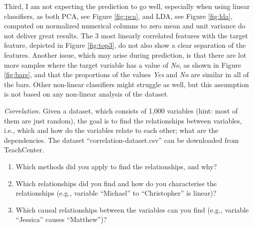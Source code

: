 \documentclass[a4paper,10pt]{article}\setlength{\textheight}{10in}\setlength{\textwidth}{6.5in}\setlength{\topmargin}{-0.125in}\setlength{\oddsidemargin}{-.2in}\setlength{\evensidemargin}{-.2in}\setlength{\headsep}{0.2in}\setlength{\footskip}{0pt}\usepackage{amsmath}\usepackage{fancyhdr}\usepackage{enumitem}\usepackage{hyperref}\usepackage{xcolor}\usepackage{graphicx}\pagestyle{fancy}
\begin{document}
\begin{enumerate}[topsep=0mm, partopsep=0mm, leftmargin=*]
Third, I am not expecting the prediction to go well, especially when using linear classifiers, as both PCA, see Figure \ref{fig:pca}, and LDA, see Figure \ref{fig:lda}, computed on normalized numerical columns to zero mean and unit variance do not deliver great results. The 3 most linearly correlated features with the target feature, depicted in Figure \ref{fig:top3}, do not also show a clear separation of the features. Another issue, which may arise during prediction, is that there are lot more samples where the target variable has a value of \textit{No}, as shown in Figure \ref{fig:bars}, and that the proportions of the values \textit{Yes} and \textit{No} are similar in all of the bars. Other non-linear classifiers might struggle as well, but this assumption is not based on any non-linear analysis of the dataset. 


{\color{blue}
\newpage\item\textit{Correlation}. Given a dataset, which consists of 1,000 variables (hint: most of them are just random), the goal is to find the relationships between variables, i.e., which and how do the variables relate to each other; what are the dependencies.
The dataset ``correlation-dataset.csv'' can be downloaded from TeachCenter.
\begin{enumerate}
	\item Which methods did you apply to find the relationships, and why?
	\item Which relationships did you find and how do you characterise the relationships (e.g., variable ``Michael'' to ``Christopher'' is linear)?
	\item Which causal relationships between the variables can you find (e.g., variable ``Jessica'' causes ``Matthew'')?
\end{enumerate}
}


\end{enumerate}
\end{document}
